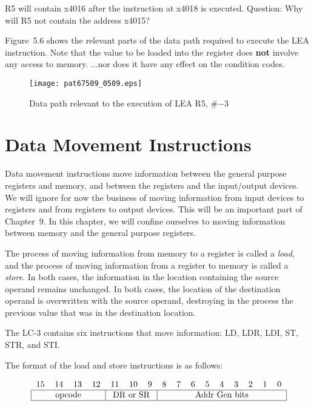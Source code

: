 \documentclass{patt}
\begin{document}
\noindent
R5 will contain x4016 after the instruction at x4018 is executed.
Question: Why will R5 not contain the address x4015?

Figure~5.6 shows the relevant parts of the data path required to execute
the LEA instruction. Note that the value to be loaded into the register does
{\bf not} involve any access to memory.  ...nor does it have any effect on the
condition codes.

\begin{figure}[b]
\begin{minipage}{\textwidth}
\centerline{\texttt{[image: pat67509\_0509.eps]}}
\caption{Data path relevant to the execution of LEA R5, \#$-$3}
\end{minipage}
\end{figure}

\FloatBarrier
\section{Data Movement Instructions}

Data movement instructions move information between\enlargethispage{-14pt}
the general purpose registers and memory, and between the registers and the
input/output devices. We will ignore for now the business of
moving information from input devices to registers and
from registers to output devices. This will be 
an important part of Chapter~9.
In this chapter, we will confine ourselves to moving information
between memory and the general purpose registers.

The process of moving information from memory to a register is
called a {\em load}, and the process of moving information
from a register to memory is called a {\em store}. In both cases,
the information in the location containing the source operand remains unchanged.
In both cases, the location of the destination
operand is overwritten with the source operand, destroying in the process
the previous value that was in the destination location.

The LC-3 contains six instructions that move information: LD,
LDR, LDI, ST, STR, and STI.

The format of the load and store instructions is as follows:\vadjust{\vspace{3pt}}

\begin{equation*}
\mbox{\renewcommand{\tabcolsep}{6pt}
\begin{tabular}{cccccccccccccccc}
15 & 14 & 13 & 12 & 11 & 10 & 9 & 8 & 7 & 6 & 5 & 4 & 3 & 2 & 1 & 0 \\
\hline
\multicolumn{4}{|c}{opcode}&\multicolumn{3}{|c|}{DR or SR}&
\multicolumn{9}{c|}{Addr Gen bits}\\
\hline
\end{tabular}}
\end{equation*}
\end{document}
